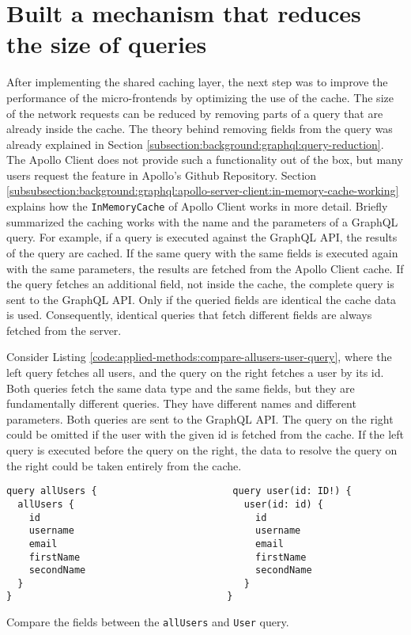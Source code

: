 \section{Built a mechanism that reduces the size of queries}\label{section:applied-methods:query-reduction}

After implementing the shared caching layer, the next step was to improve the performance of the micro-frontends by optimizing the use of the cache. The size of the network requests can be reduced by removing parts of a query that are already inside the cache. The theory behind removing fields from the query was already explained in Section \ref{subsection:background:graphql:query-reduction}. The Apollo Client does not provide such a functionality out of the box, but many users request the feature in Apollo's Github Repository. Section \ref{subsubsection:background:graphql:apollo-server-client:in-memory-cache-working} explains how the \texttt{InMemoryCache} of Apollo Client works in more detail. Briefly summarized the caching works with the name and the parameters of a GraphQL query. For example, if a query is executed against the GraphQL \ac{API}, the results of the query are cached. If the same query with the same fields is executed again with the same parameters, the results are fetched from the Apollo Client cache. If the query fetches an additional field, not inside the cache, the complete query is sent to the GraphQL \ac{API}. Only if the queried fields are identical the cache data is used. Consequently, identical queries that fetch different fields are always fetched from the server.

\bigskip

\noindent Consider Listing \ref{code:applied-methods:compare-allusers-user-query}, where the left query fetches all users, and the query on the right fetches a user by its id. Both queries fetch the same data type and the same fields, but they are fundamentally different queries. They have different names and different parameters. Both queries are sent to the GraphQL \ac{API}. The query on the right could be omitted if the user with the given id is fetched from the cache. If the left query is executed before the query on the right, the data to resolve the query on the right could be taken entirely from the cache.

\ifshowListings
\begin{listing}[H]
\begin{verbatim}
query allUsers {                        query user(id: ID!) {
  allUsers {                              user(id: id) {
    id                                      id
    username                                username
    email                                   email
    firstName                               firstName
    secondName                              secondName
  }                                       }
}                                      }
\end{verbatim}
\caption{Compare the fields between the \texttt{allUsers} and \texttt{User} query.}\label{code:applied-methods:compare-allusers-user-query}
\end{listing}
\fi

